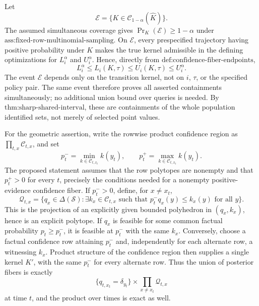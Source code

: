 Let
\[
 \mathcal E=\{K\in\mathcal C_{1-\alpha}(\widehat K)\}.
\]
The assumed simultaneous coverage gives \(\Pr_K(\mathcal E)\ge1-\alpha\) under \(\text{ass:fixed-row-multinomial-sampling}\).  On \(\mathcal E\), every prespecified trajectory having positive probability under \(K\) makes the true kernel admissible in the defining optimizations for \(L_i^\alpha\) and \(U_i^\alpha\).  Hence, directly from \(\text{def:confidence-fiber-endpoints}\),
\[
 L_i^\alpha\le L_i(K,\tau)\le U_i(K,\tau)\le U_i^\alpha.
\]
The event \(\mathcal E\) depends only on the transition kernel, not on \(i\), \(\tau\), or the specified policy pair.  The same event therefore proves all asserted containments simultaneously; no additional union bound over queries is needed.  By \(\text{thm:sharp-shared-interval}\), these are containments of the whole population identified sets, not merely of selected point values.

For the geometric assertion, write the rowwise product confidence region as \(\prod_{t,x}\mathcal C_{t,x}\), and set
\[
 p_t^- =\min_{k\in\mathcal C_{t,x_t}}k(y_t),
 \qquad
 p_t^+ =\max_{k\in\mathcal C_{t,x_t}}k(y_t).
\]
The proposed statement assumes that the row polytopes are nonempty and that \(p_t^+>0\) for every \(t\), precisely the conditions needed for a nonempty positive-evidence confidence fiber.  If \(p_t^->0\), define, for \(x\ne x_t\),
\[
 \mathcal Q_{t,x}
 =\{q_x\in\Delta(\mathcal S):
       \exists k_x\in\mathcal C_{t,x}\text{ such that }
       p_t^-q_x(y)\le k_x(y)\text{ for all }y\}.
\]
This is the projection of an explicitly given bounded polyhedron in \((q_x,k_x)\), hence is an explicit polytope.  If \(q_x\) is feasible for some common factual probability \(p_t\ge p_t^-\), it is feasible at \(p_t^-\) with the same \(k_x\).  Conversely, choose a factual confidence row attaining \(p_t^-\) and, independently for each alternate row, a witnessing \(k_x\).  Product structure of the confidence region then supplies a single kernel \(K'\), with the same \(p_t^-\) for every alternate row.  Thus the union of posterior fibers is exactly
\[
 \{q_{t,x_t}=\delta_{y_t}\}\times
 \prod_{x\ne x_t}\mathcal Q_{t,x}
\]
at time \(t\), and the product over times is exact as well.

